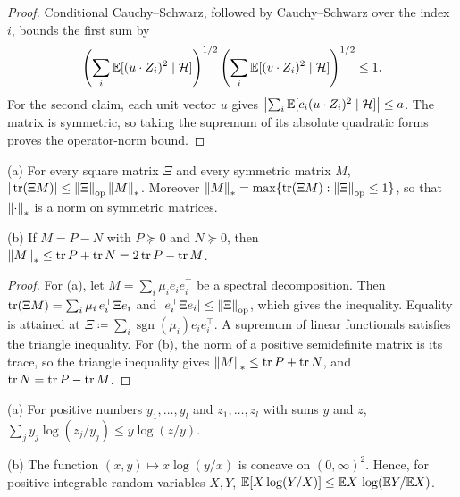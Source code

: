\begin{proof}
Conditional Cauchy--Schwarz, followed by Cauchy--Schwarz over the
index \(i\), bounds the first sum by
\[
 \left(\sum_i\mathbb E[(u\cdot Z_i)^2\mid\mathcal H]\right)^{1/2}
 \left(\sum_i\mathbb E[(v\cdot Z_i)^2\mid\mathcal H]\right)^{1/2}\le1.
\]
For the second claim, each unit vector \(u\) gives
\(\bigl|\sum_i\mathbb E[c_i(u\cdot Z_i)^2\mid\mathcal H]\bigr|\le a\).
The matrix is symmetric, so taking the supremum of its absolute
quadratic forms proves the operator-norm bound.
\end{proof}


\begin{fact}\label{tb:nuclear}
(a) For every square matrix \(\Xi\) and every symmetric matrix \(M\),
\(|\operatorname{tr}(\Xi M)|\le\left\lVert\Xi\right\rVert_{\mathrm{op}}\left\lVert M\right\rVert_*\). Moreover
\(\left\lVert M\right\rVert_*=\max\{\operatorname{tr}(\Xi M):\left\lVert\Xi\right\rVert_{\mathrm{op}}\le1\}\), so that \(\left\lVert\cdot\right\rVert_*\) is
a norm on symmetric matrices.

(b) If \(M=P-N\) with \(P\succeq0\) and \(N\succeq0\), then
\(\left\lVert M\right\rVert_*\le\operatorname{tr} P+\operatorname{tr} N=2\operatorname{tr} P-\operatorname{tr} M\).
\end{fact}

\begin{proof}
For (a), let \(M=\sum_i\mu_ie_ie_i^\top\) be a spectral decomposition. Then
\(\operatorname{tr}(\Xi M)=\sum_i\mu_i\,e_i^\top\Xi e_i\) and \(|e_i^\top\Xi e_i|\le
\left\lVert\Xi\right\rVert_{\mathrm{op}}\), which gives the inequality. Equality is attained at
\(\Xi\coloneqq \sum_i\operatorname{sgn}(\mu_i)e_ie_i^\top\). A supremum of linear
functionals satisfies the triangle inequality. For (b), the norm of a
positive semidefinite matrix is its trace, so the triangle inequality gives
\(\left\lVert M\right\rVert_*\le\operatorname{tr} P+\operatorname{tr} N\), and \(\operatorname{tr} N=\operatorname{tr} P-\operatorname{tr} M\).
\end{proof}


\begin{fact}\label{tb:logsum}
(a) For positive numbers \(y_1,\ldots,y_l\) and \(z_1,\ldots,z_l\) with sums
\(y\) and \(z\),
\(\sum_jy_j\log(z_j/y_j)\le y\log(z/y)\).

(b) The function \((x,y)\mapsto x\log(y/x)\) is concave on \((0,\infty)^2\).
Hence, for positive integrable random variables \(X,Y\),
\(\mathbb E[X\log(Y/X)]\le\mathbb E X\,\log(\mathbb E Y/\mathbb E X)\).
\end{fact}

